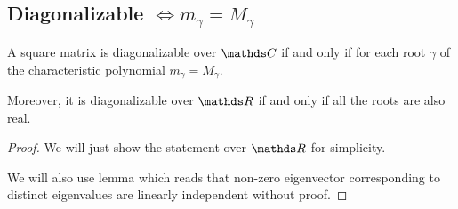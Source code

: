 \documentclass[12pt]{extarticle}
\numberwithin{equation}{section}
\begin{document}
\subsection{Diagonalizable \texorpdfstring{$\iff m_\gamma = M_\gamma$}{iff geometric equals to algebraic}}

\begin{theorem}{}{}
    A square matrix is diagonalizable over $\C$ if and only if
    for each root $\gamma$ of the characteristic polynomial
    $m_\gamma = M_\gamma$.

    Moreover, it is diagonalizable over $\R$ if and only if all the roots are also real.
\end{theorem}

\begin{proof}
    We will just show the statement over $\R$ for simplicity.

    We will also use lemma which reads that non-zero eigenvector corresponding
    to distinct eigenvalues are linearly independent without proof.


\end{proof}
\end{document}
